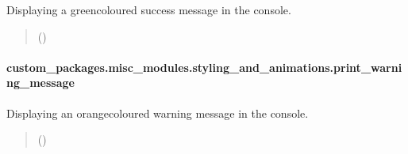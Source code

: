 \documentclass[letterpaper,10pt,english]{sphinxhowto}
\begin{document}
\begin{fulllineitems}
\label{\detokenize{_autosummary/custom_packages.misc_modules.styling_and_animations.print_success_message:custom_packages.misc_modules.styling_and_animations.print_success_message}}
\pysigstartsignatures
\pysiglinewithargsret
{}
{}
{}
\pysigstopsignatures
\sphinxAtStartPar
Displaying a green\sphinxhyphen{}coloured success message in the console.
\begin{quote}\begin{description}
\sphinxAtStartPar
{} ()

\sphinxAtStartPar
{}

\end{description}\end{quote}

\end{fulllineitems}


\sphinxstepscope


\paragraph{custom\_packages.misc\_modules.styling\_and\_animations.print\_warning\_message}
\label{\detokenize{_autosummary/custom_packages.misc_modules.styling_and_animations.print_warning_message:custom-packages-misc-modules-styling-and-animations-print-warning-message}}\label{\detokenize{_autosummary/custom_packages.misc_modules.styling_and_animations.print_warning_message::doc}}

\begin{fulllineitems}
\label{\detokenize{_autosummary/custom_packages.misc_modules.styling_and_animations.print_warning_message:custom_packages.misc_modules.styling_and_animations.print_warning_message}}
\pysigstartsignatures
\pysiglinewithargsret
{}
{}
{}
\pysigstopsignatures
\sphinxAtStartPar
Displaying an orange\sphinxhyphen{}coloured warning message in the console.
\begin{quote}\begin{description}
\sphinxAtStartPar
{} ()

\sphinxAtStartPar
{}

\end{description}\end{quote}

\end{fulllineitems}
\end{document}
